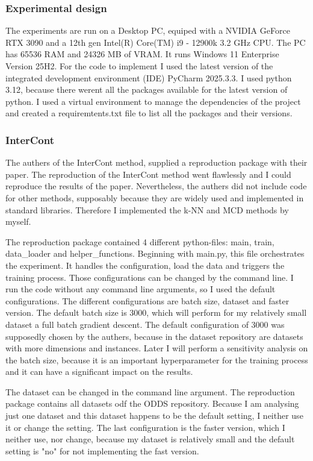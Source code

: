 \subsubsection*{Experimental design}
The experiments are run on a Desktop PC, equiped with a NVIDIA GeForce RTX 3090 and a 12th gen Intel(R) Core(TM) i9 - 12900k 3.2 GHz CPU.
The PC has 65536 RAM and 24326 MB of VRAM. 
It runs Windows 11 Enterprise Version 25H2.
For the code to implement I used the latest version of the integrated development environment (IDE) PyCharm 2025.3.3.
I used python 3.12, because there werent all the packages available for the latest version of python.
I used a virtual environment to manage the dependencies of the project and created a requiremtents.txt file to list all the packages and their versions.


\subsubsection*{InterCont}
The authers of the InterCont method, supplied a reproduction package with their paper. 
The reproduction of the InterCont method went flawlessly and I could reproduce the results of the paper.
Nevertheless, the authers did not include code for other methods, supposably because they are widely used and implemented in standard libraries.
Therefore I implemented the k-NN and MCD methods by myself.


The reproduction package contained 4 different python-files: main, train, data\_loader and helper\_functions.
Beginning with main.py, this file orchestrates the experiment. 
It handles the configuration, load the data and triggers the training process.
Those configurations can be changed by the command line.
I run the code without any command line arguments, so I used the default configurations.
The different configurations are batch size, dataset and faster version.
The default batch size is 3000, which will perform for my relatively small dataset a full batch gradient descent.
The default configuration of 3000 was supposedly chosen by the authers, because in the dataset repository are datasets with more dimensions and instances.
Later I will perform a sensitivity analysis on the batch size, because it is an important hyperparameter for the training process and it can have a significant impact on the results. 


The dataset can be changed in the command line argument.
The reproduction package contains all datasets odf the ODDS repository. 
Because I am analysing just one dataset and this dataset happens to be the default setting, I neither use it or change the setting.
The last configuration is the faster version, which I neither use, nor change, because my dataset is relatively small and the default setting is "no" for not implementing the fast version.
 

